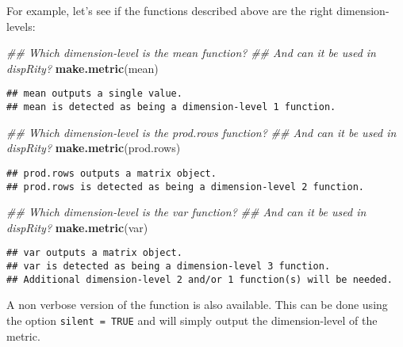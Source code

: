 \documentclass[
]{book}
\newenvironment{Shaded}{\begin{snugshade}}{\end{snugshade}}
\newcommand{\CommentTok}[1]{\textcolor[rgb]{0.56,0.35,0.01}{\textit{#1}}}
\newcommand{\KeywordTok}[1]{\textcolor[rgb]{0.13,0.29,0.53}{\textbf{#1}}}
\newcommand{\NormalTok}[1]{#1}
\begin{document}
For example, let's see if the functions described above are the right dimension-levels:

\begin{Shaded}
\begin{Highlighting}[]
\CommentTok{\#\# Which dimension{-}level is the mean function?}
\CommentTok{\#\# And can it be used in dispRity?}
\KeywordTok{make.metric}\NormalTok{(mean)}
\end{Highlighting}
\end{Shaded}

\begin{verbatim}
## mean outputs a single value.
## mean is detected as being a dimension-level 1 function.
\end{verbatim}

\begin{Shaded}
\begin{Highlighting}[]
\CommentTok{\#\# Which dimension{-}level is the prod.rows function?}
\CommentTok{\#\# And can it be used in dispRity?}
\KeywordTok{make.metric}\NormalTok{(prod.rows)}
\end{Highlighting}
\end{Shaded}

\begin{verbatim}
## prod.rows outputs a matrix object.
## prod.rows is detected as being a dimension-level 2 function.
\end{verbatim}

\begin{Shaded}
\begin{Highlighting}[]
\CommentTok{\#\# Which dimension{-}level is the var function?}
\CommentTok{\#\# And can it be used in dispRity?}
\KeywordTok{make.metric}\NormalTok{(var)}
\end{Highlighting}
\end{Shaded}

\begin{verbatim}
## var outputs a matrix object.
## var is detected as being a dimension-level 3 function.
## Additional dimension-level 2 and/or 1 function(s) will be needed.
\end{verbatim}

A non verbose version of the function is also available.
This can be done using the option \texttt{silent\ =\ TRUE} and will simply output the dimension-level of the metric.
\end{document}
